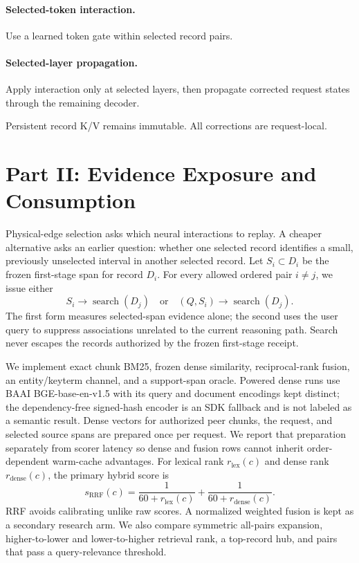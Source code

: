 \documentclass[11pt]{article}
\begin{document}
\paragraph{Selected-token interaction.}
Use a learned token gate within selected record pairs.

\paragraph{Selected-layer propagation.}
Apply interaction only at selected layers, then propagate corrected request
states through the remaining decoder.

Persistent record K/V remains immutable. All corrections are request-local.

\section{Part II: Evidence Exposure and Consumption}

Physical-edge selection asks which neural interactions to replay. A cheaper
alternative asks an earlier question: whether one selected record identifies a
small, previously unselected interval in another selected record. Let
$S_i\subset D_i$ be the frozen first-stage span for record $D_i$. For every
allowed ordered pair $i\ne j$, we issue either
\[
S_i\longrightarrow \operatorname{search}(D_j)
\quad\text{or}\quad
(Q,S_i)\longrightarrow \operatorname{search}(D_j).
\]
The first form measures selected-span evidence alone; the second uses the user
query to suppress associations unrelated to the current reasoning path. Search
never escapes the records authorized by the frozen first-stage receipt.

We implement exact chunk BM25, frozen dense similarity, reciprocal-rank fusion,
an entity/keyterm channel, and a support-span oracle. Powered dense runs use
BAAI BGE-base-en-v1.5 with its query and document encodings kept distinct; the
dependency-free signed-hash encoder is an SDK fallback and is not labeled as a
semantic result. Dense vectors for authorized peer chunks, the request, and
selected source spans are prepared once per request. We report that preparation
separately from scorer latency so dense and fusion rows cannot inherit
order-dependent warm-cache advantages. For lexical rank
$r_{\mathrm{lex}}(c)$ and dense rank $r_{\mathrm{dense}}(c)$, the primary hybrid
score is
\[
s_{\mathrm{RRF}}(c)=
\frac{1}{60+r_{\mathrm{lex}}(c)}+
\frac{1}{60+r_{\mathrm{dense}}(c)}.
\]
RRF avoids calibrating unlike raw scores. A normalized weighted fusion is kept
as a secondary research arm. We also compare symmetric all-pairs expansion,
higher-to-lower and lower-to-higher retrieval rank, a top-record hub, and pairs
that pass a query-relevance threshold.
\end{document}
